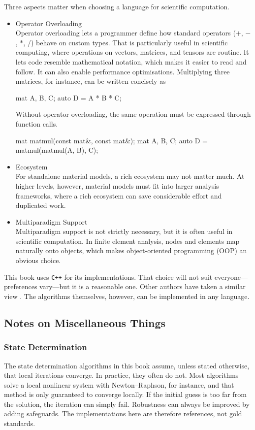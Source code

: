 Three aspects matter when choosing a language for scientific computation.
\begin{itemize}
\item Operator Overloading\\
Operator overloading lets a programmer define how standard operators ($+$, $-$, $*$, $/$) behave on custom types.
That is particularly useful in scientific computing, where operations on vectors, matrices, and tensors are routine.
It lets code resemble mathematical notation, which makes it easier to read and follow.
It can also enable performance optimisations.
Multiplying three matrices, for instance, can be written concisely as
\begin{cppcode}
    mat A, B, C;
    auto D = A * B * C;
\end{cppcode}
Without operator overloading, the same operation must be expressed through function calls.
\begin{cppcode}
    mat matmul(const mat&, const mat&);
    mat A, B, C;
    auto D = matmul(matmul(A, B), C);
\end{cppcode}
\item Ecosystem\\
For standalone material models, a rich ecosystem may not matter much.
At higher levels, however, material models must fit into larger analysis frameworks, where a rich ecosystem can save considerable effort and duplicated work.
\item Multiparadigm Support\\
Multiparadigm support is not strictly necessary, but it is often useful in scientific computation.
In finite element analysis, nodes and elements map naturally onto objects, which makes object-oriented programming (OOP) an obvious choice.
\end{itemize}

This book uses \texttt{C++} for its implementations.
That choice will not suit everyone---preferences vary---but it is a reasonable one.
Other authors have taken a similar view \cite{Poeschel2010}.
The algorithms themselves, however, can be implemented in any language.
\subsection{Notes on Miscellaneous Things}
\subsubsection{State Determination}
The state determination algorithms in this book assume, unless stated otherwise, that local iterations converge.
In practice, they often do not.
Most algorithms solve a local nonlinear system with Newton--Raphson, for instance, and that method is only guaranteed to converge locally.
If the initial guess is too far from the solution, the iteration can simply fail.
Robustness can always be improved by adding safeguards.
The implementations here are therefore references, not gold standards.
